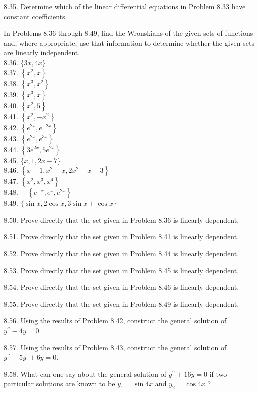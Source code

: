 \documentclass[10pt]{article}
\begin{document}
8.35. Determine which of the linear differential equations in Problem 8.33 have constant coefficients.

In Problems 8.36 through 8.49, find the Wronskians of the given sets of functions and, where appropriate, use that information to determine whether the given sets are linearly independent.\\
8.36. $\{3 x, 4 x\}$\\
8.37. $\left\{x^{2}, x\right\}$\\
8.38. $\left\{x^{3}, x^{2}\right\}$\\
8.39. $\left\{x^{3}, x\right\}$\\
8.40. $\left\{x^{2}, 5\right\}$\\
8.41. $\left\{x^{2},-x^{2}\right\}$\\
8.42. $\left\{e^{2 x}, e^{-2 x}\right\}$\\
8.43. $\left\{e^{2 x}, e^{3 x}\right\}$\\
8.44. $\left\{3 e^{2 x}, 5 e^{2 x}\right\}$\\
8.45. $\{x, 1,2 x-7\}$\\
8.46. $\left\{x+1, x^{2}+x, 2 x^{2}-x-3\right\}$\\
8.47. $\left\{x^{2}, x^{3}, x^{4}\right\}$\\
8.48. $\quad\left\{e^{-x}, e^{x}, e^{2 x}\right\}$\\
8.49. $\{\sin x, 2 \cos x, 3 \sin x+\cos x\}$

8.50. Prove directly that the set given in Problem 8.36 is linearly dependent.

8.51. Prove directly that the set given in Problem 8.41 is linearly dependent.

8.52. Prove directly that the set given in Problem 8.44 is linearly dependent.

8.53. Prove directly that the set given in Problem 8.45 is linearly dependent.

8.54. Prove directly that the set given in Problem 8.46 is linearly dependent.

8.55. Prove directly that the set given in Problem 8.49 is linearly dependent.

8.56. Using the results of Problem 8.42, construct the general solution of $y^{\prime \prime}-4 y=0$.

8.57. Using the results of Problem 8.43, construct the general solution of $y^{\prime \prime}-5 y^{\prime}+6 y=0$.

8.58. What can one say about the general solution of $y^{\prime \prime}+16 y=0$ if two particular solutions are known to be $y_{1}=\sin 4 x$ and $y_{2}=\cos 4 x$ ?
\end{document}
